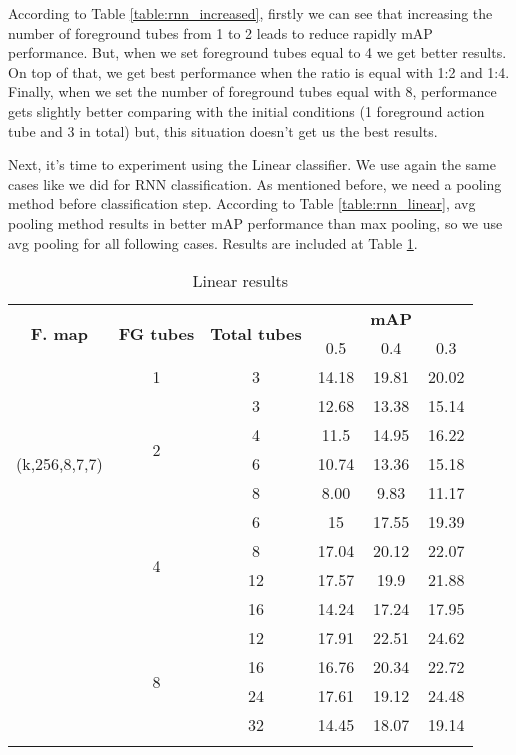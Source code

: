 According to Table \ref{table:rnn_increased}, firstly we can see that increasing the number of foreground tubes from 1 to 2 leads to reduce
rapidly mAP performance. But, when we set foreground tubes equal to 4 we get better results. On top of that, we get best performance when
the ratio is equal with 1:2 and 1:4. Finally, when we set the number of foreground tubes equal with 8, performance gets slightly better
comparing with the initial conditions (1 foreground action tube and 3 in total) but, this situation doesn't get us the best results. \par 
Next, it's time to experiment using the Linear classifier. We use again the same cases like we did for RNN classification. As mentioned
before, we need a pooling method before classification step. According to Table \ref{table:rnn_linear}, avg pooling method results in
better mAP performance than max pooling, so we use avg pooling for all following cases. Results are included at Table \ref{table:linear_increased}.

\begin{center}
  \begin{longtable}{|| c | c | c || c c c||}
    \hline
    \multirow{2}{*}{\textbf{F. map}} & \multirow{2}{*}{\textbf{FG tubes}} & \multirow{2}{*}{\textbf{Total tubes}} & {} & \textbf{mAP} & {} \\
    {}  & {} & {} & 0.5 & 0.4 & 0.3 \\
    \hline
    \multirow{7}{*}{(k,256,8,7,7)}  & 1 & 3& 14.18 &19.81 & 20.02 \\
    \cline{2-6}
    {} & \multirow{4}{*}{2} & 3 & 12.68 & 13.38 & 15.14 \\
    \cline{3-6}
    {} & {} & 4 & 11.5 & 14.95 & 16.22 \\
    \cline{3-6}
    {} & {} & 6 & 10.74 & 13.36 & 15.18 \\
    \cline{3-6}
    {} & {} & 8 & 8.00 & 9.83 & 11.17 \\
    \cline{2-6}
    {} & \multirow{4}{*}{4} & 6 & 15 & 17.55 & 19.39 \\
    \cline{3-6}
    {} & {} & 8 & 17.04	& 20.12 &22.07 \\
    \cline{3-6}
    {} & {} & 12 & 17.57 & 19.9 & 21.88 \\
    \cline{3-6}
    {} & {} & 16 & 14.24 & 17.24 & 17.95 \\

    \cline{2-6}
    {} & \multirow{4}{*}{8} & 12 & 17.91 & 22.51 & 24.62 \\
    \cline{3-6}
    {} & {} & 16 & 16.76 & 20.34 & 22.72 \\
    \cline{3-6}
    {} & {} & 24 & 17.61 & 19.12 & 24.48 \\
    \cline{3-6}
    {} & {} & 32 & 14.45 & 18.07 & 19.14  \\
    \hline

    \caption{Linear results }
    \label{table:linear_increased}
  \end{longtable}
\end{center}

